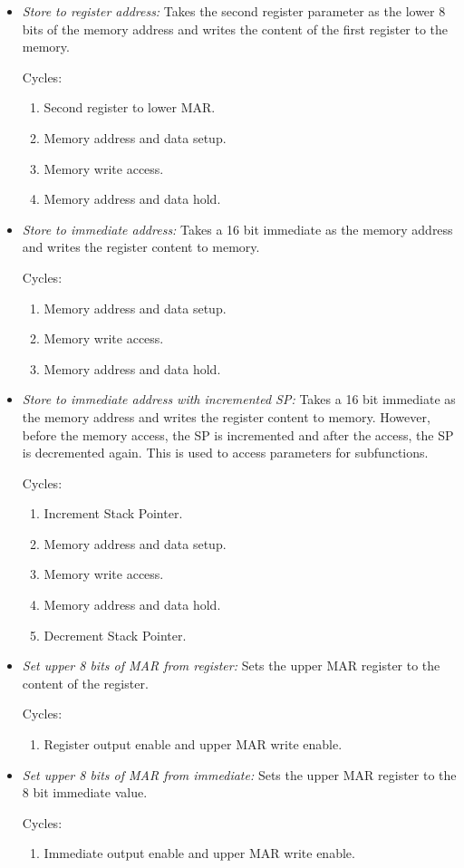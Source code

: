 \begin{itemize}
  \item \emph{Store to register address:} Takes the second register parameter as the lower 8 bits of the memory address and writes the content of the first register to the memory.

  Cycles:
  \begin{enumerate}
    \item Second register to lower \gls{MAR}.
    \item Memory address and data setup.
    \item Memory write access.
    \item Memory address and data hold.
  \end{enumerate}

  \item \emph{Store to immediate address:} Takes a 16 bit immediate as the memory address and writes the register content to memory.

  Cycles:
  \begin{enumerate}
    \item Memory address and data setup.
    \item Memory write access.
    \item Memory address and data hold.
  \end{enumerate}

  \item \emph{Store to immediate address with incremented \gls{SP}:} Takes a 16 bit immediate as the memory address and writes the register content to memory.
  However, before the memory access, the \gls{SP} is incremented and after the access, the \gls{SP} is decremented again.
  This is used to access parameters for subfunctions.

  Cycles:
  \begin{enumerate}
    \item Increment Stack Pointer.
    \item Memory address and data setup.
    \item Memory write access.
    \item Memory address and data hold.
    \item Decrement Stack Pointer.
  \end{enumerate}

  \item \emph{Set upper 8 bits of \gls{MAR} from register:} Sets the upper \gls{MAR} register to the content of the register.

  Cycles:
  \begin{enumerate}
    \item Register output enable and upper \gls{MAR} write enable.
  \end{enumerate}

  \item \emph{Set upper 8 bits of \gls{MAR} from immediate:} Sets the upper \gls{MAR} register to the 8 bit immediate value.

  Cycles:
  \begin{enumerate}
    \item Immediate output enable and upper \gls{MAR} write enable.
  \end{enumerate}
\end{itemize}

